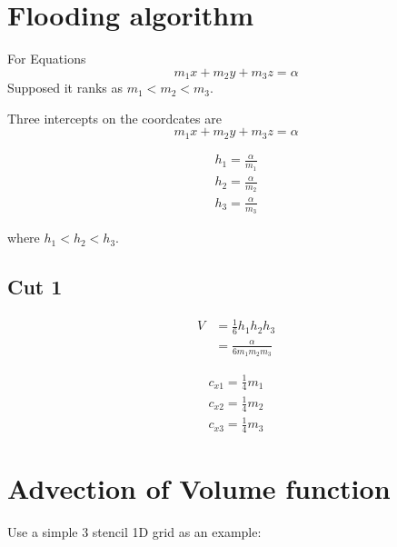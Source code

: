 \documentclass{article}
\begin{document}
\section{Flooding algorithm}
For Equations
\begin{equation}
  \label{eq:cut-1}
  m_{1}x+m_{2}y+m_{3}z = \alpha
\end{equation}
Supposed it ranks as $m_{1}<m_{2}<m_{3}$.

Three intercepts on the coordcates are
\begin{equation}
  \label{eq:cut-1}
  m_{1}x+m_{2}y+m_{3}z = \alpha
\end{equation}

\begin{equation}
  \begin{aligned}
  \label{eq:cut-1}
  h_{1} = \frac{\alpha}{m_{1}} \\
  h_{2} = \frac{\alpha}{m_{2}} \\
  h_{3} = \frac{\alpha}{m_{3}}
  \end{aligned}
\end{equation}

where $h_{1} < h_{2} < h_{3}$.

\subsection{Cut 1}

\begin{equation}
\begin{aligned}
\label{eq:cut1}
V &= \frac{1}{6}h_{1}h_{2}h_{3} \\
& = \frac{\alpha}{6m_{1}m_{2}m_{3}}
\end{aligned}
\end{equation}

\begin{equation}
\begin{aligned}
\label{eq:cut1}
  c_{x1} = \frac{1}{4}m_{1} \\
  c_{x2} = \frac{1}{4}m_{2} \\
  c_{x3} = \frac{1}{4}m_{3}
\end{aligned}
\end{equation}


\section{Advection of Volume function}
Use a simple 3 stencil 1D grid as an example:

\end{document}
